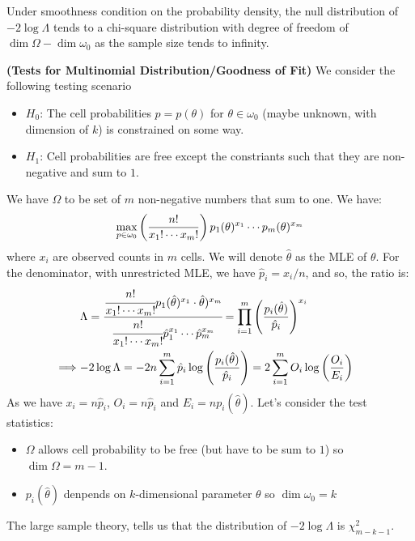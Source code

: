\begin{theorem}
    Under smoothness condition on the probability density, the null distribution of $-2\log\Lambda$ tends to a chi-square distribution with degree of freedom of $\dim\Omega - \dim\omega_0$ as the sample size tends to infinity.
\end{theorem}

\begin{example}{\textbf{(Tests for Multinomial Distribution/Goodness of Fit)}}
    We consider the following testing scenario
    \begin{itemize}
        \item $H_0$: The cell probabilities $p = p(\theta)$ for $\theta \in \omega_0$ (maybe unknown, with dimension of $k$) is constrained on some way.
        \item $H_1$: Cell probabilities are free except the constriants such that they are non-negative and sum to $1$. 
    \end{itemize}
    We have $\Omega$ to be set of $m$ non-negative numbers that sum to one. We have:
    \begin{equation*}
        \max_{p\in\omega_0}\left( \frac{n!}{x_1!\cdots x_m!} \right)p_1(\theta)^{x_1}\cdots p_m(\theta)^{x_m}
    \end{equation*}
    where $x_i$ are observed counts in $m$ cells. We will denote $\hat{\theta}$ as the MLE of $\theta$. For the denominator, with unrestricted MLE, we have $\hat{p}_i = x_i/n$, and so, the ratio is:
    \begin{equation*}
    \begin{aligned}
        &\Lambda = \cfrac{\cfrac{n!}{x_1!\cdots x_m!}p_1(\hat{\theta})^{x_1}\cdot\hat{\theta})^{x_m}}{\cfrac{n!}{x_1!\cdots x_m!}\hat{p}^{x_1}_1\cdots\hat{p}^{x_m}_m} =\prod^m_{i=1}\left( \frac{p_i(\hat{\theta})}{\hat{p}_i} \right)^{x_i} \\
        \implies& \begin{aligned}[t]
            -2\log\Lambda &= -2n\sum^m_{i=1}\hat{p}_i\log\left( \frac{p_i(\hat{\theta})}{\hat{p}_i} \right)
            = 2\sum^m_{i=1}O_i\log\left( \frac{O_i}{E_i} \right)
        \end{aligned}
    \end{aligned}
    \end{equation*}
    As we have $x_i = n\hat{p}_i$, $O_i=n\hat{p}_i$ and $E_i=np_i(\hat{\theta})$. Let's consider the test statistics:
    \begin{itemize}
        \item $\Omega$ allows cell probability to be free (but have to be sum to $1$) so $\dim \Omega = m-1$. 
        \item $p_i(\hat{\theta})$ denpends on $k$-dimensional parameter $\theta$ so $\dim\omega_0 = k$
    \end{itemize}
    The large sample theory, tells us that the distribution of $-2\log\Lambda$ is $\chi^2_{m-k-1}$. 
\end{example}

